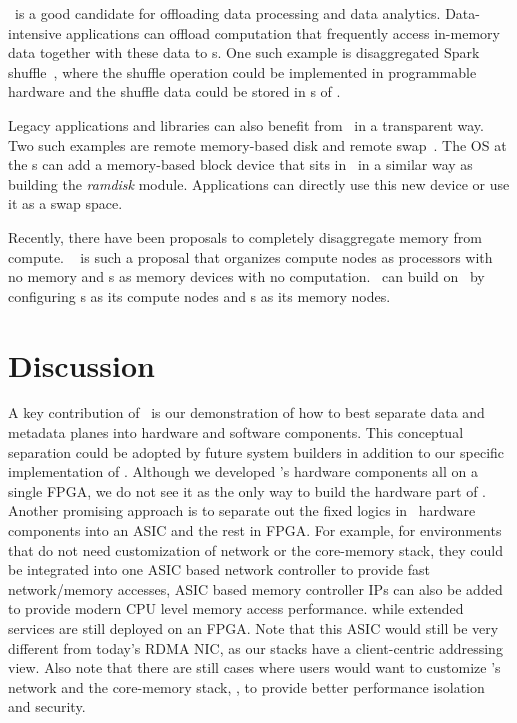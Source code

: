 \documentclass[10pt,times,twocolumn]{article}
\begin{document}
\begin{appendices}
\phdm\ is a good candidate for offloading data processing and data analytics. 
Data-intensive applications can offload computation that frequently access in-memory data together with 
these data to \MN{}s.
One such example is disaggregated Spark shuffle~\cite{Stuedi-ATC19}, where the shuffle
operation could be implemented in programmable hardware and the shuffle data could be 
stored in \MN{}s of \phdm.

Legacy applications and libraries can also benefit from \phdm\ in a transparent way.
Two such examples are remote memory-based disk and remote swap~\cite{InfiniSwap}.
The OS at the \CN{}s can add a memory-based block device that sits in \phdm\
in a similar way as building the {\em ramdisk} module.
Applications can directly use this new device or use it as a swap space.

Recently, there have been proposals to completely disaggregate memory from compute.
\lego~\cite{Shan18-OSDI} is such a proposal that organizes compute nodes as processors with no memory 
and \MN{}s as memory devices with no computation.
\lego\ can build on \phdm\ by configuring \CN{}s as its compute nodes %
and \MN{}s as its memory nodes. %

\section{Discussion}
\label{sec:discussion}

A key contribution of \sys\ is our demonstration of how to best separate 
data and metadata planes into hardware and software components.
This conceptual separation could be adopted by future system builders
in addition to our specific implementation of \sys.
Although we developed \sys's hardware components all on a single FPGA,
we do not see it as the only way to build the hardware part of \sys.
Another promising approach is to separate out the fixed logics in \sys\ hardware components
into an ASIC and the rest in FPGA. 
For example, for environments that do not need customization of network or the core-memory stack,
they could be integrated into one ASIC based network controller to provide fast network/memory accesses,
ASIC based memory controller IPs can also be added to provide modern CPU level memory access performance.
while extended services are still deployed on an FPGA.
Note that this ASIC would still be very different from today's RDMA NIC,
as our stacks have a client-centric addressing view.
Also note that there are still cases where users would want to customize \sys's network and the core-memory stack,
\eg, to provide better performance isolation and security.



\end{appendices}
\end{document}
